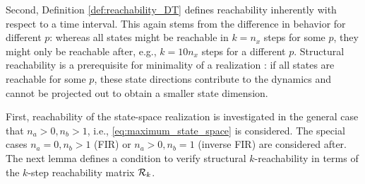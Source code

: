 Second, Definition \ref{def:reachability_DT} defines reachability inherently with respect to a time interval. This again stems from the difference in behavior for different $p$: whereas all states might be reachable in $k=n_x$ steps for some $p$, they might only be reachable after, e.g., $k=10n_x$ steps for a different $p$. Structural reachability is a prerequisite for minimality of a realization \cite{Gohberg1992}: if all states are reachable for some $p$, these state directions contribute to the dynamics and cannot be projected out to obtain a smaller state dimension.

First, reachability of the state-space realization is investigated in the general case that $n_a > 0, n_b > 1$, i.e., \eqref{eq:maximum_state_space} is considered. The special cases $n_a = 0, n_b>1$ (FIR) or $n_a > 0, n_b =1$ (inverse FIR) are considered after. The next lemma defines a condition to verify structural $k$-reachability in terms of the $k$-step reachability matrix $\mathcal{R}_k$.

